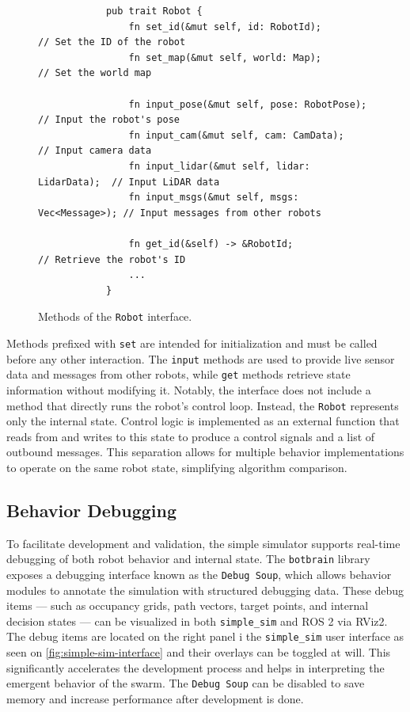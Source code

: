 \begin{figure}[H]
    \begin{center}
        \begin{verbatim}
            pub trait Robot {
                fn set_id(&mut self, id: RobotId);            // Set the ID of the robot
                fn set_map(&mut self, world: Map);            // Set the world map

                fn input_pose(&mut self, pose: RobotPose);    // Input the robot's pose
                fn input_cam(&mut self, cam: CamData);        // Input camera data
                fn input_lidar(&mut self, lidar: LidarData);  // Input LiDAR data
                fn input_msgs(&mut self, msgs: Vec<Message>); // Input messages from other robots

                fn get_id(&self) -> &RobotId;                 // Retrieve the robot's ID
                ...
            }
        \end{verbatim}
    \end{center}
    \caption{Methods of the \texttt{Robot} interface.}
    \label{fig:robot-interface}
\end{figure}

Methods prefixed with \texttt{set} are intended for initialization and must be called before any other interaction. The \texttt{input} methods are used to provide live sensor data and messages from other robots, while \texttt{get} methods retrieve state information without modifying it. Notably, the interface does not include a method that directly runs the robot’s control loop. Instead, the \texttt{Robot} represents only the internal state. Control logic is implemented as an external function that reads from and writes to this state to produce a control signals and a list of outbound messages. This separation allows for multiple behavior implementations to operate on the same robot state, simplifying algorithm comparison.

\subsection{Behavior Debugging}
To facilitate development and validation, the simple simulator supports real-time debugging of both robot behavior and internal state. The \texttt{botbrain} library exposes a debugging interface known as the \texttt{Debug Soup}, which allows behavior modules to annotate the simulation with structured debugging data. These debug items --- such as occupancy grids, path vectors, target points, and internal decision states --- can be visualized in both \texttt{simple\_sim} and ROS 2 via RViz2. The debug items are located on the right panel i the \texttt{simple\_sim} user interface as seen on \cref{fig:simple-sim-interface} and their overlays can be toggled at will. This significantly accelerates the development process and helps in interpreting the emergent behavior of the swarm. The \texttt{Debug Soup} can be disabled to save memory and increase performance after development is done.

